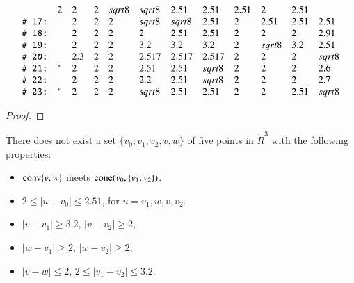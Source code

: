 \begin{tarskidata}
\begin{tarski}
\begin{lemma}
$$\begin{array}{llllllllllll}
   &2 &2 &2 &\sqrt{8}& \sqrt{8} &2.51& 2.51 & 2.51 & 2 &  2.51\\
%
 \rr{17}&\tuid{OQXGZCQ}\tlabel{tarski:E:part4:9}
   &2 &2 &2 &\sqrt{8}& \sqrt{8} &2.51& 2 & 2.51 & 2.51 &  2.51\\
%
 \rr{18}&\tuid{GCRJNIH}\tlabel{tarski:E:part4:10}
   &2 &2 &2 &  2& 2.51 &2.51&   2 & 2 & 2 &  2.91\\
%
 \rr{19}&\tuid{QFJLWUC}\tlabel{tarski:dcg-p142}
   &2 &2 &2 &   3.2& 3.2 &3.2&   2 & \sqrt8 & 3.2 &  2.51\\
%
 \rr{20}&\tuid{TADGJXO}\tlabel{tarski:convex-quad}
   &2.3 &2 &2 &   2.517& 2.517 &2.517&  2 & 2 & 2 &  \sqrt8\\
 \rr{21}&\tuid{RPIOZZC}\tlabel{tarski:last:E}\usage{DCG-[11.22]{ remark:2.6}}
   &2 &2 &2 &  2.51& 2.51 &\sqrt8&  2 & 2 & 2 & 2.6\\
%
 \rr{22}&\tuid{JBUAAWJ} \tlabel{tarski:rem2.7}
     &2 &2 &2 &2.2& 2.51 &\sqrt{8}& 2 & 2 & 2 & 2.7\\
%
 \rr{23}&\tuid{NNPXALF} \tlabel{tarski:pass-anchor}\usage{DCG-[4.24]{ lemma:pass-anchor}}
     &2&2&2&\sqrt8 &2.51 &2.51 &2 &2 &2.51&\sqrt8\\
\end{array}$$
\end{lemma}

\begin{proof}
\end{proof}
\end{tarski}


 






\begin{tarski}

\begin{lemma}
  There does not exist a set $\{v_0,v_1,v_2,v,w\}$ of five points
in $\ring{R}^3$ with the following properties:
\begin{itemize}
  \item ${\operatorname{conv}}\{v,w\}$ meets ${\operatorname{cone}}(v_0,\{v_1,v_2\})$.
  \item $2\le |u-v_0| \le 2.51$, for $u=v_1,w,v,v_2$.
    \item $|v-v_1|\ge 3.2$,  $|v-v_2|\ge 2$,
    \item $|w-v_1|\ge2$, $|w-v_2|\ge2$,
    \item   $|v-w|\le2$, $2\le |v_1-v_2|\le 3.2$.
\end{itemize}
\end{lemma}


\end{tarski}
\end{tarskidata}
